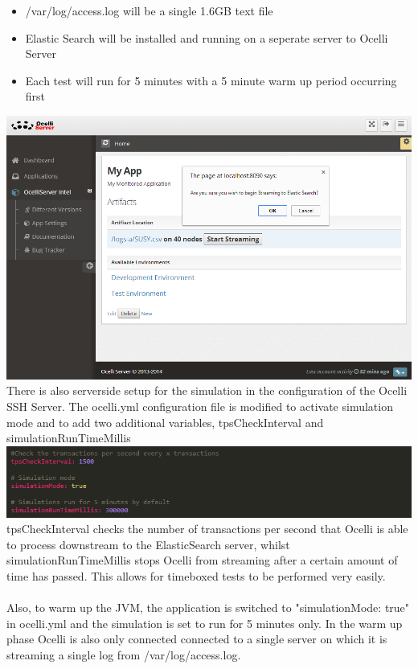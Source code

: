 \documentclass{llncs}
\begin{document}
\begin{itemize}
\item /var/log/access.log will be a single 1.6GB text file
\item Elastic Search will be installed and running on a seperate server to Ocelli Server
\item Each test will run for 5 minutes with a 5 minute warm up period occurring first
\end{itemize}

\includegraphics[scale=0.5]{app2}\newline\newline
There is also serverside setup for the simulation in the configuration of the Ocelli SSH Server. The ocelli.yml configuration file is modified to activate simulation mode and to add two additional variables, tpsCheckInterval and simulationRunTimeMillis\newline\newline
\includegraphics[scale=0.75]{app3}\newline\newline
tpsCheckInterval checks the number of transactions per second that Ocelli is able to process downstream to the ElasticSearch server, whilst simulationRunTimeMillis stops Ocelli from streaming after a certain amount of time has passed. This allows for timeboxed tests to be performed very easily.
\\
\\
Also, to warm up the JVM, the application is switched to "simulationMode: true" in ocelli.yml and the simulation is set to run for 5 minutes only. In the warm up phase Ocelli is also only connected connected to a single server on which it is streaming a single log from /var/log/access.log.
\pagebreak
\end{document}
